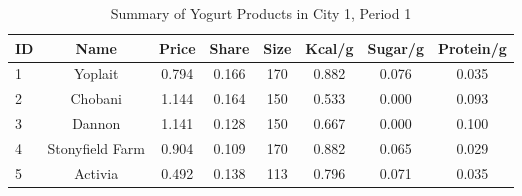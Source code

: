\begin{table}[htbp]
\centering
\caption{Summary of Yogurt Products in City 1, Period 1}
\begin{tabular}{lccccccc}
\toprule
ID & Name & Price & Share & Size & Kcal/g & Sugar/g & Protein/g \\
\midrule
1 & Yoplait & 0.794 & 0.166 & 170 & 0.882 & 0.076 & 0.035 \\
2 & Chobani & 1.144 & 0.164 & 150 & 0.533 & 0.000 & 0.093 \\
3 & Dannon & 1.141 & 0.128 & 150 & 0.667 & 0.000 & 0.100 \\
4 & Stonyfield Farm & 0.904 & 0.109 & 170 & 0.882 & 0.065 & 0.029 \\
5 & Activia & 0.492 & 0.138 & 113 & 0.796 & 0.071 & 0.035 \\
\bottomrule
\end{tabular}

\label{tab:yoghurt_summary}
\end{table}
